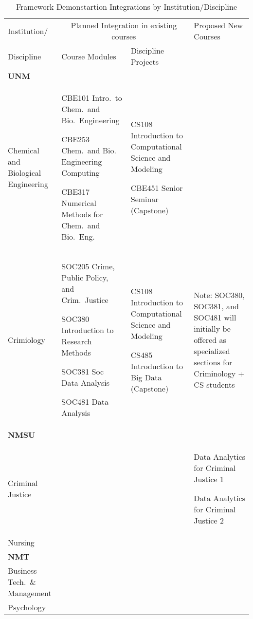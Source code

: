 \begin{table}[tbhp]
\begin{tabular}{|p{1in}|p{1.75in}|p{1.5in}|p{1.5in}|}
\hline
\hline
     Institution/ & \multicolumn{2}{c|}{Planned Integration in existing courses} & Proposed New Courses\\ 
     \cline{2-3}
     Discipline   & Course Modules & Discipline Projects                   & \\
     \hline\hline
     \textbf{UNM} & & &  \\  
     \hline
     Chemical and Biological Engineering 
                & CBE101 Intro.\ to Chem.\ and Bio.\ Engineering
                
                  CBE253 Chem.\ and Bio. Engineering Computing
                  
                  CBE317 Numerical Methods for Chem.\ and Bio.\ Eng.
                & CS108 Introduction to Computational Science and Modeling
                
                  CBE451 Senior Seminar (Capstone)
                &\\
     \hline
     Crimiology & SOC205 Crime, Public Policy, and Crim.\ Justice
     
                  SOC380 Introduction to Research Methods 
                  
                  SOC381 Soc Data Analysis
                  
                  SOC481 Data Analysis
                & CS108 Introduction to Computational Science and Modeling
                
                  CS485 Introduction to Big Data (Capstone)
                & Note: SOC380, SOC381, and SOC481 will initially be offered as specialized sections for Criminology + CS students\\
     \hline\hline
     \textbf{NMSU} & & & \\
     \hline
     Criminal Justice & 
                      & 
                      & Data Analytics for Criminal Justice 1
                      
                        Data Analytics for Criminal Justice 2 \\
     \hline
     Nursing & & & \\
    \hline\hline
     \textbf{NMT} & & & \\                 
     \hline
     Business Tech.\ \& Management & & & \\
     \hline
     Psychology & & & \\
\hline\hline
\end{tabular}
\caption{Framework Demonstartion Integrations by Institution/Discipline}
\label{tab:pilots}
\end{table}

